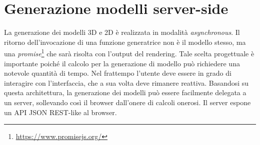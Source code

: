 \section{Generazione modelli server-side}
\label{sec:chapter_3_section_4}

\noindent
La generazione dei modelli 3D e 2D è realizzata in modalità \emph{asynchronous}.
Il ritorno dell'invocazione di una funzione generatrice non \`e il modello stesso,
ma una \emph{promise}\footnote{\url{https://www.promisejs.org/}} che sarà risolta con l'output del rendering. Tale scelta progettuale \`e importante poich\'e il calcolo per la
generazione di modello pu\`o richiedere una notevole quantità di tempo.
Nel frattempo l'utente deve essere in grado di interagire con l'interfaccia, che a sua volta deve rimanere reattiva.
Basandosi su questa architettura, la generazione dei modelli può essere facilmente delegata a un server,
sollevando così il browser dall'onere di calcoli onerosi. Il server espone un API JSON REST-like al browser.


\newpage
